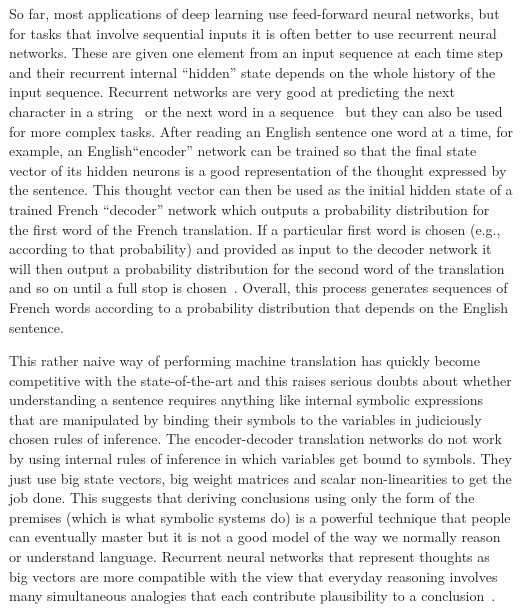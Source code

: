 \documentclass[]{article}
\begin{document}
So far, most applications of deep learning use feed-forward neural
networks, but for tasks that involve sequential inputs it is often better
to use recurrent neural networks. These are given one element from an input %
sequence at each time step and their recurrent internal ``hidden'' state
depends on the whole history of the input sequence. Recurrent networks are
very good at predicting the next character in a string~\citep{Sutskever-et-al-ICML2011} or
the next word in a sequence~\citep{Mikolov-et-al-NIPS2013} but they can also be used for
more complex tasks.  After reading an English sentence one word at a time,
for example, an English``encoder'' network can be trained so that the final
state vector of its hidden neurons is a good representation of the thought
expressed by the sentence.  This thought vector can then be used as the
initial hidden state of a trained French ``decoder'' network which outputs
a probability distribution for the first word of the French translation. If
a particular first word is chosen (e.g., according to that probability)
and provided as input to the decoder
network it will then output a probability distribution for the second word
of the translation and so on until a full stop is 
chosen~\citep{Vinyals-et-al-arxiv2014,Bahdanau-et-al-arxiv2014}. 
Overall, this process generates sequences of French words according to
a probability distribution that depends on the English sentence.

This rather naive way of performing machine translation has quickly become
competitive with the state-of-the-art and this raises serious doubts about
whether understanding a sentence requires anything like internal symbolic
expressions that are manipulated by binding their symbols to the variables
in judiciously chosen rules of inference.  The encoder-decoder translation
networks do not work by using internal rules of inference in which
variables get bound to symbols. They just use big state vectors, big weight
matrices and scalar non-linearities to get the job done.  This suggests
that deriving conclusions using only the form of the premises (which is
what symbolic systems do) is a powerful
technique that people can eventually master but it is not a good model of
the way we normally reason or understand language. Recurrent neural
networks that represent thoughts as big vectors are more compatible with
the view that everyday reasoning involves many simultaneous analogies that
each contribute plausibility to a conclusion~\citep{metaphors}.
\end{document}
